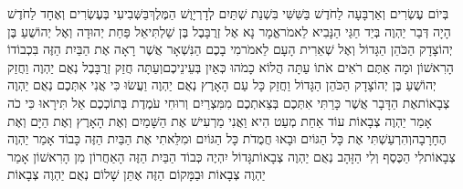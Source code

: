 \documentclass[../main/main.tex]{subfiles}
\begin{document}
\begin{multicols*}{\ncols}
בְּיוֹם עֶשְׂרִים וְאַרְבָּעָה לַחֹדֶשׁ בַּשִּׁשִּׁי בִּשְׁנַת שְׁתַּיִם לְדָרְיָוֶשׁ הַמֶּלֶךְ\PreChapterSpace{}בַּשְּׁבִיעִי בְּעֶשְׂרִים וְאֶחָד לַחֹדֶשׁ הָיָה דְּבַר יַהְוֶה בְּיַד חַגַּי הַנָּבִיא לֵאמֹר\PreVerseSpace{}אֱמָר נָא אֶל זְרֻבָּבֶל בֶּן שַׁלְתִּיאֵל פַּחַת יְהוּדָה וְאֶל יְהוֹשֻׁעַ בֶּן יְהוֹצָדָק הַכֹּהֵן הַגָּדוֹל וְאֶל שְׁאֵרִית הָעָם לֵאמֹר\PreVerseSpace{}מִי בָכֶם הַנִּשְׁאָר אֲשֶׁר רָאָה אֶת הַבַּיִת הַזֶּה בִּכְבוֹדוֹ הָרִאשׁוֹן וּמָה אַתֶּם רֹאִים אֹתוֹ עַתָּה הֲלוֹא כָמֹהוּ כְּאַיִן בְּעֵינֵיכֶם\PreVerseSpace{}וְעַתָּה חֲזַק זְרֻבָּבֶל נְאֻם יַהְוֶה וַחֲזַק יְהוֹשֻׁעַ בֶּן יְהוֹצָדָק הַכֹּהֵן הַגָּדוֹל וַחֲזַק כָּל עַם הָאָרֶץ נְאֻם יַהְוֶה וַעֲשׂוּ כִּי אֲנִי אִתְּכֶם נְאֻם יַהְוֶה צְבָאוֹת\PreVerseSpace{}אֶת הַדָּבָר אֲשֶׁר כָּרַתִּי אִתְּכֶם בְּצֵאתְכֶם מִמִּצְרַיִם וְרוּחִי עֹמֶדֶת בְּתוֹכְכֶם אַל תִּירָאוּ \ClosedSection{}כִּי כֹה אָמַר יַהְוֶה צְבָאוֹת עוֹד אַחַת מְעַט הִיא וַאֲנִי מַרְעִישׁ אֶת הַשָּׁמַיִם וְאֶת הָאָרֶץ וְאֶת הַיָּם וְאֶת הֶחָרָבָה\PreVerseSpace{}וְהִרְעַשְׁתִּי אֶת כָּל הַגּוֹיִם וּבָאוּ חֲמֻדֹת\SubEnd{} כָּל הַגּוֹיִם וּמִלֵּאתִי אֶת הַבַּיִת הַזֶּה כָּבוֹד אָמַר יַהְוֶה צְבָאוֹת\PreVerseSpace{}לִי הַכֶּסֶף וְלִי הַזָּהָב נְאֻם יַהְוֶה צְבָאוֹת\PreVerseSpace{}גָּדוֹל יִהְיֶה כְּבוֹד הַבַּיִת הַזֶּה הָאַחֲרוֹן מִן הָרִאשׁוֹן אָמַר יַהְוֶה צְבָאוֹת וּבַמָּקוֹם הַזֶּה אֶתֵּן שָׁלוֹם נְאֻם יַהְוֶה צְבָאוֹת\OpenSection{}\par

\end{multicols*}
\end{document}
